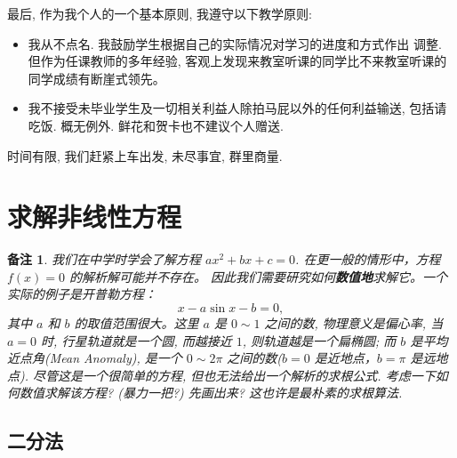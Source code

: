 \documentclass[a4paper]{ctexart}
\newtheorem{remark}{备注}
\numberwithin{theorem}{section}
\numberwithin{equation}{section}
\numberwithin{figure}{section}
\numberwithin{remark}{section}
\begin{document}
最后, 作为我个人的一个基本原则, 我遵守以下教学原则:

\begin{itemize}
  \item 我从不点名. 我鼓励学生根据自己的实际情况对学习的进度和方式作出
    调整. 但作为任课教师的多年经验, 客观上发现来教室听课的同学比不来教室听课的同学成绩有断崖式领先。
  \item 我不接受未毕业学生及一切相关利益人除拍马屁以外的任何利益输送,
    包括请吃饭. 概无例外. 鲜花和贺卡也不建议个人赠送.  
\end{itemize}

时间有限, 我们赶紧上车出发, 未尽事宜, 群里商量.



\section{求解非线性方程}

\begin{remark}
我们在中学时学会了解方程 $ax^2 + bx + c = 0$. 在更一般的情形中，方程 $f(x) = 0$ 的解析解可能并不存在。
因此我们需要研究如何\textbf{数值地}求解它。一个实际的例子是开普勒方程：
\[
x - a \sin x - b = 0,
\]
其中 $a$ 和 $b$ 的取值范围很大。这里 $a$ 是 $0 \sim 1$ 之间的数, 物理意义是偏心率, 
当 $a = 0$ 时, 行星轨道就是一个圆, 而越接近 $1$, 则轨道越是一个扁椭圆; 而 $b$ 是平均近点角(Mean Anomaly), 
是一个 $0 \sim 2 \pi$ 之间的数($b = 0$ 是近地点，$b = \pi$ 是远地点). 尽管这是一个很简单的方程, 
但也无法给出一个解析的求根公式. 
考虑一下如何数值求解该方程? (暴力一把?) 先画出来? 这也许是最朴素的求根算法.    
\end{remark}

\subsection{二分法}
\end{document}
